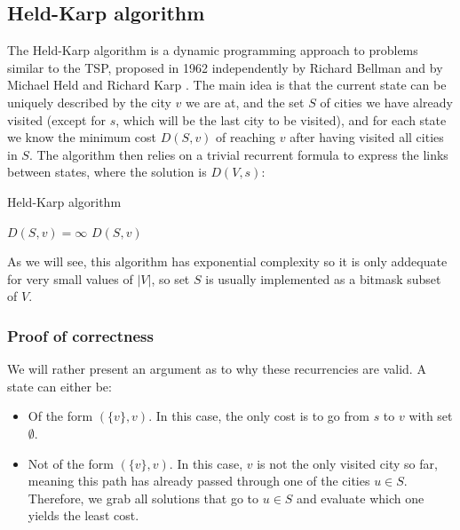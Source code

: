 \subsection{Held-Karp algorithm} \label{algorithm-tsp-heldkarp}
The Held-Karp algorithm is a dynamic programming approach to problems similar to the \acrlong*{TSP}, proposed in 1962 independently by Richard Bellman \cite{bellman62} and by Michael Held and Richard Karp \cite{held-karp62}. The main idea is that the current state can be uniquely described by the city $v$ we are at, and the set $S$ of cities we have already visited (except for $s$, which will be the last city to be visited), and for each state we know the minimum cost $D(S,v)$ of reaching $v$ after having visited all cities in $S$. The algorithm then relies on a trivial recurrent formula to express the links between states, where the solution is $D(V, s)$:
\begin{algorithm}[H]
    \caption{Held-Karp algorithm}
    \label{alg:held-karp}
    \begin{algorithmic}[1]
         {$D(S,v)=\infty$}
        \EndFor
             \Return $D(S,v)$
            \EndIf
              
            \EndIf
                 
            \EndFor
            \State {}
        \EndFunction
    \end{algorithmic}
\end{algorithm}
As we will see, this algorithm has exponential complexity so it is only addequate for very small values of $|V|$, so set $S$ is usually implemented as a bitmask subset of $V$.
\subsubsection{Proof of correctness}
We will rather present an argument as to why these recurrencies are valid. A state can either be:
\begin{itemize}
    \item Of the form $(\{v\}, v)$. In this case, the only cost is to go from $s$ to $v$ with set $\emptyset$.
    \item Not of the form $(\{v\}, v)$. In this case, $v$ is not the only visited city so far, meaning this path has already passed through one of the cities $u \in S$. Therefore, we grab all solutions that go to $u \in S$ and evaluate which one yields the least cost.
\end{itemize}
